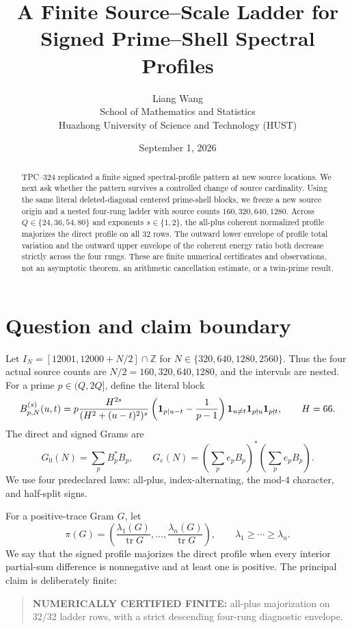 \documentclass[10pt]{article}
\title{A Finite Source--Scale Ladder for Signed Prime--Shell Spectral Profiles}
\author{Liang Wang\\School of Mathematics and Statistics\\Huazhong University of Science and Technology (HUST)}
\date{September 1, 2026}
\begin{document}
\maketitle

\begin{abstract}
TPC--324 replicated a finite signed spectral-profile pattern at new source
locations.  We next ask whether the pattern survives a controlled change of
source cardinality.  Using the same literal deleted-diagonal centered
prime-shell blocks, we freeze a new source origin and a nested four-rung
ladder with source counts $160,320,640,1280$.  Across
$Q\in\{24,36,54,80\}$ and exponents $s\in\{1,2\}$, the all-plus coherent
normalized profile majorizes the direct profile on all $32$ rows.  The
outward lower envelope of profile total variation and the outward upper
envelope of the coherent energy ratio both decrease strictly across the four
rungs.  These are finite numerical certificates and observations, not an
asymptotic theorem, an arithmetic cancellation estimate, or a twin-prime
result.
\end{abstract}

\section{Question and claim boundary}

Let $I_N=[12001,12000+N/2]\cap\mathbb Z$ for
$N\in\{320,640,1280,2560\}$.  Thus the four actual source counts are
$N/2=160,320,640,1280$, and the intervals are nested.  For a prime
$p\in(Q,2Q]$, define the literal block
\begin{equation}
B_{p,N}^{(s)}(u,t)=p\frac{H^{2s}}{(H^2+(u-t)^2)^s}
\left({\bf 1}_{p\mid u-t}-\frac1{p-1}\right)
{\bf 1}_{u\ne t}{\bf 1}_{p\nmid u}{\bf 1}_{p\nmid t},
\qquad H=66.
\end{equation}
The direct and signed Grams are
\begin{equation}
G_0(N)=\sum_p B_p^*B_p,\qquad
G_e(N)=\left(\sum_p e_pB_p\right)^*
                 \left(\sum_p e_pB_p\right).
\end{equation}
We use four predeclared laws: all-plus, index-alternating, the mod-$4$
character, and half-split signs.

For a positive-trace Gram $G$, let
\[
\pi(G)=\left(\frac{\lambda_1(G)}{\operatorname{tr}G},\ldots,
 \frac{\lambda_n(G)}{\operatorname{tr}G}\right),
 \qquad \lambda_1\geq\cdots\geq\lambda_n.
\]
We say that the signed profile majorizes the direct profile when every
interior partial-sum difference is nonnegative and at least one is positive.
The principal claim is deliberately finite:
\begin{quote}
\textbf{NUMERICALLY CERTIFIED FINITE:} all-plus majorization on $32/32$
ladder rows, with a strict descending four-rung diagnostic envelope.
\end{quote}
\end{document}
